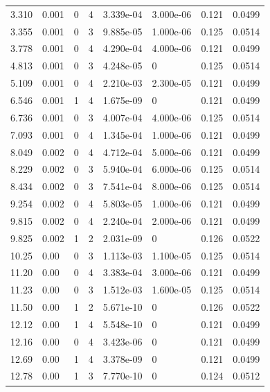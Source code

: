 \documentclass[preview]{standalone}
\begin{document}
{{\begin{tabular}{L{1.2cm}C{1.2cm} C{0.3cm}C{0.5cm} C{1.4cm}C{1.4cm} C{1.4cm}C{1.4cm}}
  3.310  &  0.001  & 0     &  4 &  3.339e-04  & 3.000e-06  & 0.121 &  0.0499   \\ 
  3.355  &  0.001  & 0     &  3 &  9.885e-05  & 1.000e-06  & 0.125 &  0.0514   \\ 
  3.778  &  0.001  & 0     &  4 &  4.290e-04  & 4.000e-06  & 0.121 &  0.0499   \\ 
  4.813  &  0.001  & 0     &  3 &  4.248e-05  & 0  & 0.125 &  0.0514   \\ 
  5.109  &  0.001  & 0     &  4 &  2.210e-03  & 2.300e-05  & 0.121 &  0.0499   \\ 
  6.546  &  0.001  & 1     &  4 &  1.675e-09  & 0  & 0.121 &  0.0499   \\ 
  6.736  &  0.001  & 0     &  3 &  4.007e-04  & 4.000e-06  & 0.125 &  0.0514   \\ 
  7.093  &  0.001  & 0     &  4 &  1.345e-04  & 1.000e-06  & 0.121 &  0.0499   \\ 
  8.049  &  0.002  & 0     &  4 &  4.712e-04  & 5.000e-06  & 0.121 &  0.0499   \\ 
  8.229  &  0.002  & 0     &  3 &  5.940e-04  & 6.000e-06  & 0.125 &  0.0514   \\ 
  8.434  &  0.002  & 0     &  3 &  7.541e-04  & 8.000e-06  & 0.125 &  0.0514   \\ 
  9.254  &  0.002  & 0     &  4 &  5.803e-05  & 1.000e-06  & 0.121 &  0.0499   \\ 
  9.815  &  0.002  & 0     &  4 &  2.240e-04  & 2.000e-06  & 0.121 &  0.0499   \\ 
  9.825  &  0.002  & 1     &  2 &  2.031e-09  & 0  & 0.126 &  0.0522   \\ 
  10.25  &  0.00  & 0     &  3 &  1.113e-03  & 1.100e-05  & 0.125 &  0.0514   \\ 
  11.20  &  0.00  & 0     &  4 &  3.383e-04  & 3.000e-06  & 0.121 &  0.0499   \\ 
  11.23  &  0.00  & 0     &  3 &  1.512e-03  & 1.600e-05  & 0.125 &  0.0514   \\ 
  11.50  &  0.00  & 1     &  2 &  5.671e-10  & 0  & 0.126 &  0.0522   \\ 
  12.12  &  0.00  & 1     &  4 &  5.548e-10  & 0  & 0.121 &  0.0499   \\ 
  12.16  &  0.00  & 0     &  4 &  3.423e-06  & 0  & 0.121 &  0.0499   \\ 
  12.69  &  0.00  & 1     &  4 &  3.378e-09  & 0  & 0.121 &  0.0499   \\ 
  12.78  &  0.00  & 1     &  3 &  7.770e-10  & 0  & 0.124 &  0.0512   \\ 

\end{tabular}}}
\end{document}
